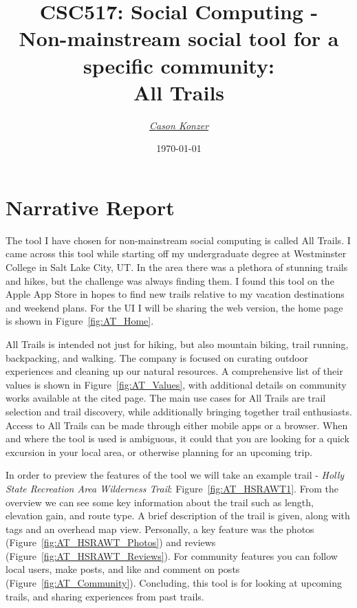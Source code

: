 \documentclass[12pt]{article}
\newcommand{\XB}{\color{black}}
\newcommand{\XV}{\color{violet}}
\begin{document}
\title{\textbf{CSC517}: Social Computing - \\ Non-mainstream social tool for a specific community: \\ All Trails}
\date{\today}
\author{\XV\textit{\large{\href{https://github.com/casonk}{Cason Konzer}}}\XB}

\maketitle
\hrulefill
\vfill

\pagebreak

\tableofcontents
\listoffigures

\newpage

\section{Narrative Report}
The tool I have chosen for non-mainstream social computing is called All Trails.
I came across this tool while starting off my undergraduate degree at Westminster College in Salt Lake City, UT.
In the area there was a plethora of stunning trails and hikes, but the challenge was always finding them.
I found this tool on the Apple App Store in hopes to find new trails relative to my vacation destinations and weekend plans.
For the UI I will be sharing the web version, the home page is shown in Figure~\ref{fig:AT_Home}.

All Trails is intended not just for hiking, but also mountain biking, trail running, backpacking, and walking.
The company is focused on curating outdoor experiences and cleaning up our natural resources.
A comprehensive list of their values is shown in Figure~\ref{fig:AT_Values}, with additional details on community works available at the cited page.
The main use cases for All Trails are trail selection and trail discovery, while additionally bringing together trail enthusiasts.
Access to All Trails can be made through either mobile apps or a browser.
When and where the tool is used is ambiguous, it could that you are looking for a quick excursion in your local area, or otherwise planning for an upcoming trip.

In order to preview the features of the tool we will take an example trail - \emph{Holly State Recreation Area Wilderness Trail}: Figure~\ref{fig:AT_HSRAWT1}.
From the overview we can see some key information about the trail such as length, elevation gain, and route type.
A brief description of the trail is given, along with tags and an overhead map view.
Personally, a key feature was the photos (Figure~\ref{fig:AT_HSRAWT_Photos}) and reviews (Figure~\ref{fig:AT_HSRAWT_Reviews}).
For community features you can follow local users, make posts, and like and comment on posts (Figure~\ref{fig:AT_Community}).
Concluding, this tool is for looking at upcoming trails, and sharing experiences from past trails.
\end{document}
